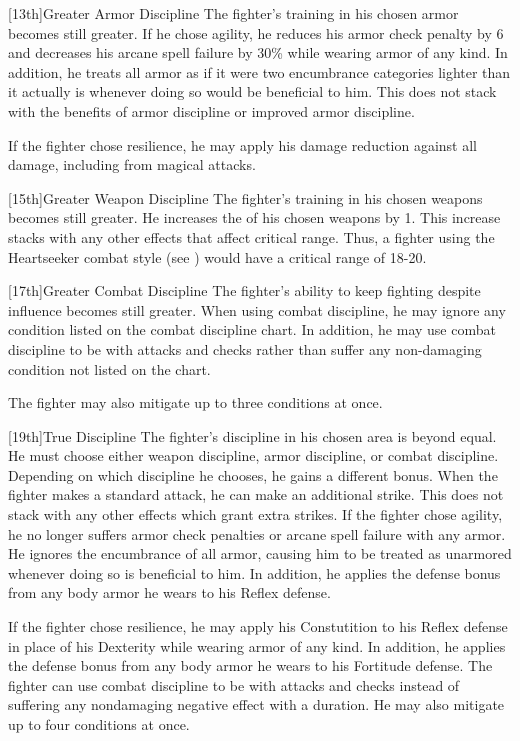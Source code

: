 [13th]{Greater Armor Discipline}
The fighter's training in his chosen armor becomes still greater.
If he chose agility, he reduces his armor check penalty by 6 and decreases his arcane spell failure by 30\% while wearing armor of any kind.
In addition, he treats all armor as if it were two encumbrance categories lighter than it actually is whenever doing so would be beneficial to him.
This does not stack with the benefits of armor discipline or improved armor discipline.

If the fighter chose resilience, he may apply his damage reduction against all damage, including from magical attacks.

[15th]{Greater Weapon Discipline}
The fighter's training in his chosen weapons becomes still greater.
He increases the  of his chosen weapons by 1.
This increase stacks with any other effects that affect critical range.
Thus, a fighter using the Heartseeker combat style (see ) would have a critical range of 18-20.

[17th]{Greater Combat Discipline}
The fighter's ability to keep fighting despite influence becomes still greater.
When using combat discipline, he may ignore any condition listed on the combat discipline chart.
In addition, he may use combat discipline to be \severelyimpaired with attacks and checks rather than suffer any non-damaging condition not listed on the chart.

\par The fighter may also mitigate up to three conditions at once.

[19th]{True Discipline}
The fighter's discipline in his chosen area is beyond equal.
He must choose either weapon discipline, armor discipline, or combat discipline.
Depending on which discipline he chooses, he gains a different bonus.
    When the fighter makes a standard attack, he can make an additional strike.
    This does not stack with any other effects which grant extra strikes.
    If the fighter chose agility, he no longer suffers armor check penalties or arcane spell failure with any armor.
    He ignores the encumbrance of all armor, causing him to be treated as unarmored whenever doing so is beneficial to him.
    In addition, he applies the defense bonus from any body armor he wears to his Reflex defense.

    If the fighter chose resilience, he may apply his Constutition to his Reflex defense in place of his Dexterity while wearing armor of any kind.
    In addition, he applies the defense bonus from any body armor he wears to his Fortitude defense.
    The fighter can use combat discipline to be \impaired with attacks and checks instead of suffering any nondamaging negative effect with a duration.
    He may also mitigate up to four conditions at once.

